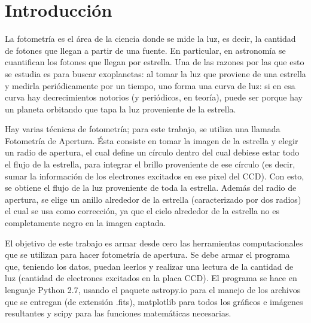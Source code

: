 \documentclass[a4paper, 11pt, spanish]{article}
\begin{document}
\clearpage


\newpage

\tableofcontents %
\listoffigures %

\newpage

\section{Introducci\'on}
La fotometr\'ia es el \'area de la ciencia donde se mide la luz, es decir, la cantidad de fotones que llegan a partir de una fuente. En particular, en astronom\'ia se cuantifican los fotones que llegan por estrella. Una de las razones por las que esto se estudia es para buscar exoplanetas: al tomar la luz que proviene de una estrella y medirla peri\'odicamente por un tiempo, uno forma una curva de luz: si en esa curva hay decrecimientos notorios (y peri\'odicos, en teor\'ia), puede ser porque hay un planeta orbitando que tapa la luz proveniente de la estrella. 

Hay varias t\'ecnicas de fotometr\'ia; para este trabajo, se utiliza una llamada Fotometr\'ia de Apertura. \'Esta consiste en tomar la imagen de la estrella y elegir un radio de apertura, el cual define un c\'irculo dentro del cual debiese estar todo el flujo de la estrella, para integrar el brillo proveniente de ese c\'irculo (es decir, sumar la informaci\'on de los electrones excitados en ese pixel del CCD). Con esto, se obtiene el flujo de la luz proveniente de toda la estrella. Adem\'as del radio de apertura, se elige un anillo alrededor de la estrella (caracterizado por dos radios) el cual se usa como correcci\'on, ya que el cielo alrededor de la estrella no es completamente negro en la imagen captada.


El objetivo de este trabajo es armar desde cero las herramientas computacionales que se utilizan para hacer fotometr\'ia de apertura. Se debe armar el programa que, teniendo los datos, puedan leerlos y realizar una lectura de la cantidad de luz (cantidad de electrones excitados en la placa CCD). El programa se hace en lenguaje Python 2.7, usando el paquete astropy.io para el manejo de los archivos que se entregan (de extensi\'on .fits), matplotlib para todos los gr\'aficos e im\'agenes resultantes y scipy para las funciones matem\'aticas necesarias.
\end{document}
